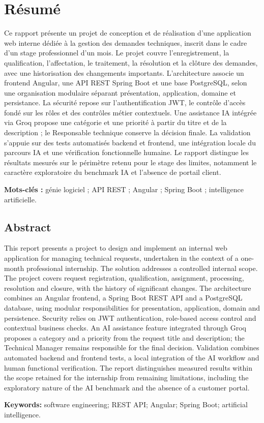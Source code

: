 \chapter*{Résumé}
\begin{singlespace}

Ce rapport présente un projet de conception et de réalisation d'une application web interne dédiée à la gestion des demandes techniques, inscrit dans le cadre d'un stage professionnel d'un mois. Le projet couvre l'enregistrement, la qualification, l'affectation, le traitement, la résolution et la clôture des demandes, avec une historisation des changements importants. L'architecture associe un frontend Angular, une API REST Spring Boot et une base PostgreSQL, selon une organisation modulaire séparant présentation, application, domaine et persistance. La sécurité repose sur l'authentification JWT, le contrôle d'accès fondé sur les rôles et des contrôles métier contextuels. Une assistance IA intégrée via Groq propose une catégorie et une priorité à partir du titre et de la description ; le Responsable technique conserve la décision finale. La validation s'appuie sur des tests automatisés backend et frontend, une intégration locale du parcours IA et une vérification fonctionnelle humaine. Le rapport distingue les résultats mesurés sur le périmètre retenu pour le stage des limites, notamment le caractère exploratoire du benchmark IA et l'absence de portail client.

\textbf{Mots-clés :} génie logiciel ; API REST ; Angular ; Spring Boot ; intelligence artificielle.

\section*{Abstract}

This report presents a project to design and implement an internal web application for managing technical requests, undertaken in the context of a one-month professional internship. The solution addresses a controlled internal scope. The project covers request registration, qualification, assignment, processing, resolution and closure, with the history of significant changes. The architecture combines an Angular frontend, a Spring Boot REST API and a PostgreSQL database, using modular responsibilities for presentation, application, domain and persistence. Security relies on JWT authentication, role-based access control and contextual business checks. An AI assistance feature integrated through Groq proposes a category and a priority from the request title and description; the Technical Manager remains responsible for the final decision. Validation combines automated backend and frontend tests, a local integration of the AI workflow and human functional verification. The report distinguishes measured results within the scope retained for the internship from remaining limitations, including the exploratory nature of the AI benchmark and the absence of a customer portal.

\textbf{Keywords:} software engineering; REST API; Angular; Spring Boot; artificial intelligence.
\end{singlespace}
